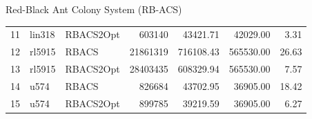 \documentclass{beamer}
\begin{document}
\begin{frame}{Red-Black Ant Colony System (RB-ACS)}
\begin{table}[H]
\begin{tabular}{lllrrrr}
            11 & lin318   & RBACS2Opt & 603140     & 43421.71       & 42029.00         & 3.31  \\
            12 & rl5915   & RBACS     & 21861319   & 716108.43      & 565530.00        & 26.63 \\
            13 & rl5915   & RBACS2Opt & 28403435   & 608329.94      & 565530.00        & 7.57  \\
            14 & u574     & RBACS     & 826684     & 43702.95       & 36905.00         & 18.42 \\
            15 & u574     & RBACS2Opt & 899785     & 39219.59       & 36905.00         & 6.27  \\
            \bottomrule
        \end{tabular}
    \end{table}
\end{frame}
\end{document}
